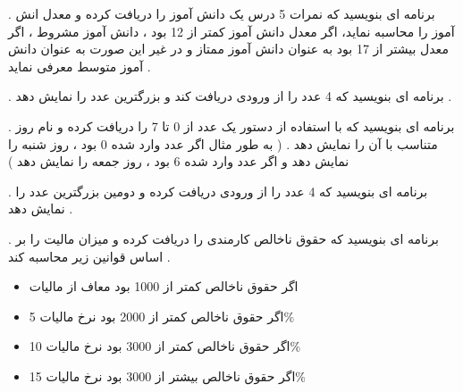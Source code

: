\documentclass[12pt]{article}
\begin{document}
 . برنامه ای بنویسید که نمرات 5 درس یک دانش آموز را دریافت کرده و معدل انش آموز را محاسبه نماید، اگر معدل دانش آموز کمتر از 12 بود ، دانش آموز مشروط ، اگر معدل بیشتر از 17 بود به عنوان دانش آموز ممتاز و در غیر این صورت به عنوان دانش آموز متوسط معرفی نماید .
















 . برنامه ای بنویسید که 4 عدد را از ورودی دریافت کند و بزرگترین عدد را نمایش دهد .












 . برنامه ای بنویسید که با استفاده از دستور 
یک عدد از 0 تا 7 را دریافت کرده و نام روز متناسب با آن را نمایش دهد . ( به طور مثال اگر عدد وارد شده 0 بود ، روز شنبه را نمایش دهد و اگر عدد وارد شده 6 بود ، روز جمعه را نمایش دهد  )













 . برنامه ای بنویسید که 4 عدد را از ورودی دریافت کرده و دومین بزرگترین عدد را نمایش دهد .


















 . برنامه ای بنویسید که حقوق ناخالص کارمندی را دریافت کرده و میزان مالیت را بر اساس قوانین زیر محاسبه کند .

\begin{itemize}
	\item اگر حقوق ناخالص کمتر از 1000 بود معاف از مالیات
	\item اگر حقوق ناخالص کمتر از 2000 بود نرخ مالیات
	 5\%
	\item اگر حقوق ناخالص کمتر از 3000 بود نرخ مالیات
	10\%
	\item اگر حقوق ناخالص بیشتر از 3000 بود نرخ مالیات
	15\%
\end{itemize}
\end{document}
